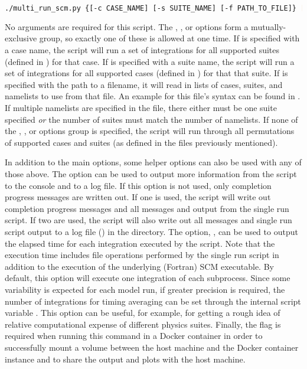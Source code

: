 \begin{lstlisting}[language=bash]
./multi_run_scm.py {[-c CASE_NAME] [-s SUITE_NAME] [-f PATH_TO_FILE]} [-v{v}] [-t] [-d]
\end{lstlisting}

No arguments are required for this script. The , , or  options form a mutually-exclusive group, so exactly one of these is allowed at one time. If  is specified with a case name, the script will run a set of integrations for all supported suites (defined in ) for that case. If  is specified with a suite name, the script will run a set of integrations for all supported cases (defined in ) for that that suite. If  is specified with the path to a filename, it will read in lists of cases, suites, and namelists to use from that file. An example for this file's syntax can be found in . If multiple namelists are specified in the file, there either must be one suite specified \emph{or} the number of suites must match the number of namelists. If none of the , , or  options group is specified, the script will run through all permutations of supported cases and suites (as defined in the files previously mentioned).

In addition to the main options, some helper options can also be used with any of those above. The  option can be used to output more information from the script to the console and to a log file. If this option is not used, only completion progress messages are written out. If one  is used, the script will write out completion progress messages and all messages and output from the single run script. If two  are used, the script will also write out all messages and single run script output to a log file () in the  directory. The option, , can be used to output the elapsed time for each integration executed by the script. Note that the execution time includes file operations performed by the single run script in addition to the execution of the underlying (Fortran) SCM executable. By default, this option will execute one integration of each subprocess. Since some variability is expected for each model run, if greater precision is required, the number of integrations for timing averaging can be set through the internal script variable . This option can be useful, for example, for getting a rough idea of relative computational expense of different physics suites. Finally, the  flag is required when running this command in a Docker container in order to successfully mount a volume between the host machine and the Docker container instance and to share the output and plots with the host machine.


